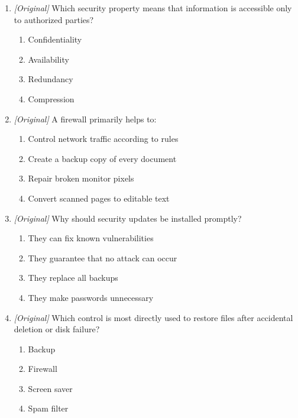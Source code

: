 \begin{enumerate}[label=\textbf{Q\arabic*.}, leftmargin=*]
\begin{enumerate}[label=\Alph*.]
    \item Unknown attachments should not be opened.
    \item Public Wi-Fi needs no caution at all.
  \end{enumerate}
\item \textit{[Original]} Which security property means that information is accessible only to authorized parties?
  \begin{enumerate}[label=\Alph*.]
\item Confidentiality
   \item Availability
   \item Redundancy
   \item Compression
  \end{enumerate}

\item \textit{[Original]} A firewall primarily helps to:
  \begin{enumerate}[label=\Alph*.]
\item Control network traffic according to rules
   \item Create a backup copy of every document
   \item Repair broken monitor pixels
   \item Convert scanned pages to editable text
  \end{enumerate}

\item \textit{[Original]} Why should security updates be installed promptly?
  \begin{enumerate}[label=\Alph*.]
\item They can fix known vulnerabilities
   \item They guarantee that no attack can occur
   \item They replace all backups
   \item They make passwords unnecessary
  \end{enumerate}

\item \textit{[Original]} Which control is most directly used to restore files after accidental deletion or disk failure?
  \begin{enumerate}[label=\Alph*.]
\item Backup
   \item Firewall
   \item Screen saver
   \item Spam filter
  \end{enumerate}


\end{enumerate}
